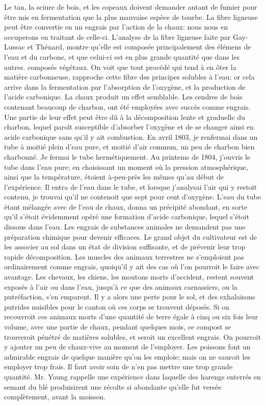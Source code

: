 Le tan, la sciure de bois, et les copeaux doivent demander autant de fumier pour être mis en fermentation que la plus mauvaise espèce de tourbe.
La fibre ligneuse peut être convertie en un engrais par l'action de la chaux: nous nous en occuperons en traitant de celle-ci.
L'analyse de la fibre ligneuse faite par Gay-Lussac et Thénard, montre qu'elle est composée principalement des élémens de l'eau et du carbone, et que celui-ci est en plus grande quantité que dans les autres.\setcounter{page}{166} composés végétaux. On voit que tout procédé qui tend à en ôter la matière carbonneuse, rapproche cette fibre des principes solubles à l'eau: or cela arrive dans la fermentation par l'absorption de l'oxygène, et la production de l'acide carbonique. La chaux produit un effet semblable.
Les cendres de bois contenant beaucoup de charbon, ont été employées avec succès comme engrais. Une partie de leur effet peut être dû à la décomposition lente et graduelle du charbon, lequel paroît susceptible d'absorber l'oxygène et de se changer ainsi en acide carbonique sans qu'il y ait combustion.
En avril 1803, je renfermai dans un tube à moitié plein d'eau pure, et moitié d'air commun, un peu de charbon bien charbonné. Je fermai le tube hermétiquement.
Au printems de 1804, j'ouvris le tube dans l'eau pure; en choisissant un moment où la pression atmosphérique, ainsi que la température, étoient à-peu-près les mêmes qu'au début de l'expérience.
Il entra de l'eau dans le tube, et lorsque j'analysai l'air qui y restoit contenu, je trouvai qu'il ne contenoit que sept pour cent d'oxygène. L'eau du tube étant mélangée avec\setcounter{page}{167} de l'eau de chaux, donna un précipité abondant, en sorte qu'il s'étoit évidemment opéré une formation d'acide carbonique, lequel s'étoit dissous dans l'eau.
Les engrais de substances animales ne demandent pas une préparation chimique pour devenir efficaces. Le grand objet du cultivateur est de les associer au sol dans un état de division suffisante, et de prévenir leur trop rapide décomposition.
Les muscles des animaux terrestres ne s'emploient pas ordinairement comme engrais, quoiqu'il y ait des cas où l'on pourroit le faire avec avantage. Les chevaux, les chiens, les moutons morts d'accident, restent souvent exposés à l'air ou dans l'eau, jusqu'à ce que des animaux carnassiers, ou la putréfaction, s'en emparent. Il y a alors une perte pour le sol, et des exhalaisons putrides nuisibles pour le canton où ces corps se trouvent déposés.
Si on recouvroit ces animaux morts d'une quantité de terre égale à cinq ou six fois leur volume, avec une partie de chaux, pendant quelques mois, ce compost se trouveroit pénétré de matières solubles, et seroit un excellent engrais. On pourroit y ajouter un peu de chaux-vive au moment de l'employer.\setcounter{page}{168} Les poissons font un admirable engrais de quelque manière qu'on les emploie; mais on ne sauroit les employer trop frais. Il faut avoir soin de n'en pas mettre une trop grande quantité. Mr. Young rappelle une expérience dans laquelle des harengs enterrés en semant du blé produisirent une récolte si abondante qu'elle fut versée complètement, avant la moisson.
